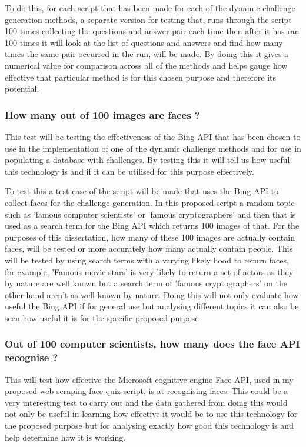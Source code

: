 \documentclass[12pt,a4paper]{article}
\begin{document}
To do this, for each script that has been made for each of the dynamic challenge generation methods, a separate version for testing that, runs through the script 100 times collecting the questions and answer pair each time then after it has ran 100 times it will look at the list of questions and answers and find how many times the same pair occurred in the run, will be made. By doing this it gives a numerical value for comparison across all of the methods and helps gauge how effective that particular method is for this chosen purpose and therefore its potential. 
\subsubsection{How many out of 100 images are faces ?}  
This test will be testing the effectiveness of the Bing API that has been chosen to use in the implementation of one of the dynamic challenge methods and for use in populating a database with challenges. By testing this it will tell us how useful this technology is and if it can be utilised for this purpose effectively. 

To test this a test case of the script will be made that uses the Bing API to collect faces for the challenge generation. In this proposed script a random topic such as 'famous computer scientists' or 'famous cryptographers' and then that is used as a search term for the Bing API which returns 100 images of that. For the purposes of this dissertation, how many of these 100 images are actually contain faces, will be tested or more accurately how many actually contain people. This will be tested by using search terms with a varying likely hood to return faces, for example,  'Famous movie stars' is very likely to return a set of actors as they by nature are well known but a search term of 'famous cryptographers' on the other hand aren't as well known by nature. Doing this will not only evaluate how useful the Bing API if for general use but analysing different topics it can also be seen how useful it is for the specific  proposed purpose 
\subsubsection{Out of 100 computer scientists, how many does the face API recognise ?} 
This will test how effective the Microsoft cognitive engine Face API, used in my proposed web scraping face quiz script, is at recognising faces. This could be a very interesting test to carry out and the data gathered from doing this would not only be useful in learning how effective it would be to use this technology for the proposed purpose but for analysing exactly how good this technology is and help determine how it is working. 
\end{document}
